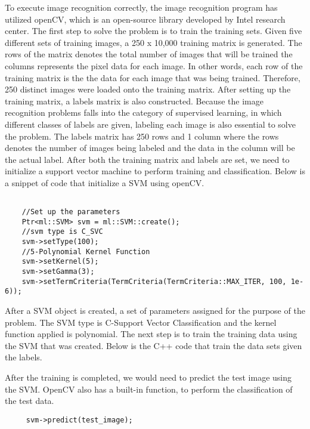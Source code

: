 \documentclass[a4paper]{article}
\begin{document}
To execute image recognition correctly, the image recognition program has utilized openCV, which is an open-source library developed by Intel research center. 
The first step to solve the problem is to train the training sets. Given five different sets of training images, a 250 x 10,000 training matrix is generated. The rows of the matrix denotes the total number of images that will be trained the columns represents the pixel data for each image. In other words, each row of the training matrix is the the data for each image that was being trained. Therefore, 250 distinct images were loaded onto the training matrix. After setting up the training matrix, a labels matrix is also constructed. Because the image recognition problems falls into the category of supervised learning, in which different classes of labels are given, labeling each image is also essential to solve the problem. The labels matrix has 250 rows and 1 column where the rows denotes the number of images being labeled and the data in the column will be the actual label. After both the training matrix and labels are set, we need to initialize a support vector machine to perform training and classification. Below is a snippet of code that initialize a SVM using openCV.
\begin{lstlisting}

    //Set up the parameters
    Ptr<ml::SVM> svm = ml::SVM::create();
    //svm type is C_SVC
    svm->setType(100);
    //5-Polynomial Kernel Function
    svm->setKernel(5);
    svm->setGamma(3);
    svm->setTermCriteria(TermCriteria(TermCriteria::MAX_ITER, 100, 1e-6));
\end{lstlisting}
After a SVM object is created, a set of parameters assigned for the purpose of the problem. The SVM type is C-Support Vector Classification and the kernel function applied is polynomial. The next step is to train the training data using the SVM that was created. Below is the C++ code that train the data sets given the labels.

After the training is completed, we would need to predict the test image using the SVM. OpenCV also has a built-in function, to perform the classification of the test data. 
\begin{lstlisting}
     svm->predict(test_image);
\end{lstlisting}
\end{document}
